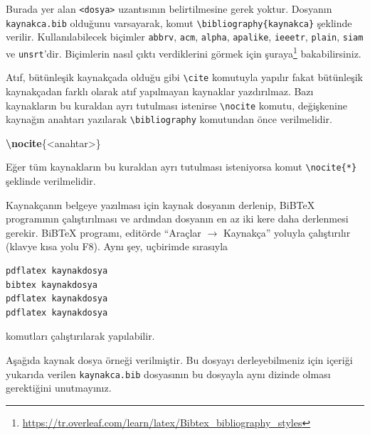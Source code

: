 \documentclass[
  10pt,
]{scrbook}
\newenvironment{Shaded}{\begin{snugshade}}{\end{snugshade}}
\newcommand{\ExtensionTok}[1]{#1}
\newcommand{\KeywordTok}[1]{\textcolor[rgb]{0.13,0.29,0.53}{\textbf{#1}}}
\newcommand{\NormalTok}[1]{#1}
\renewcommand{\href}[2]{#2\footnote{\url{#1}}}
\theoremstyle{definition}
\theoremstyle{definition}
\theoremstyle{definition}
\theoremstyle{definition}
\theoremstyle{remark}
\begin{document}
Burada yer alan \texttt{\textless{}dosya\textgreater{}} uzantısının belirtilmesine gerek yoktur. Dosyanın \texttt{kaynakca.bib} olduğunu varsayarak, komut \texttt{\textbackslash{}bibliography\{kaynakca\}} şeklinde verilir. Kullanılabilecek biçimler \texttt{abbrv}, \texttt{acm}, \texttt{alpha}, \texttt{apalike}, \texttt{ieeetr}, \texttt{plain}, \texttt{siam} ve \texttt{unsrt}'dir. Biçimlerin nasıl çıktı verdiklerini görmek için \href{https://tr.overleaf.com/learn/latex/Bibtex_bibliography_styles}{şuraya} bakabilirsiniz.

Atıf, bütünleşik kaynakçada olduğu gibi \texttt{\textbackslash{}cite} komutuyla yapılır fakat bütünleşik kaynakçadan farklı olarak atıf yapılmayan kaynaklar yazdırılmaz. Bazı kaynakların bu kuraldan ayrı tutulması istenirse \texttt{\textbackslash{}nocite} komutu, değişkenine kaynağın anahtarı yazılarak \texttt{\textbackslash{}bibliography} komutundan önce verilmelidir.

\begin{Shaded}
\begin{Highlighting}[]
\KeywordTok{\textbackslash{}nocite}\NormalTok{\{}\ExtensionTok{\textless{}anahtar\textgreater{}}\NormalTok{\}}
\end{Highlighting}
\end{Shaded}

Eğer tüm kaynakların bu kuraldan ayrı tutulması isteniyorsa komut \texttt{\textbackslash{}nocite\{*\}} şeklinde verilmelidir.

Kaynakçanın belgeye yazılması için kaynak dosyanın derlenip, BiBTeX programının çalıştırılması ve ardından dosyanın en az iki kere daha derlenmesi gerekir. BiBTeX programı, editörde ``Araçlar \(\rightarrow\) Kaynakça'' yoluyla çalıştırılır (klavye kısa yolu F8). Aynı şey, uçbirimde sırasıyla

\begin{verbatim}
pdflatex kaynakdosya
bibtex kaynakdosya
pdflatex kaynakdosya
pdflatex kaynakdosya
\end{verbatim}

komutları çalıştırılarak yapılabilir.

Aşağıda kaynak dosya örneği verilmiştir. Bu dosyayı derleyebilmeniz için içeriği yukarıda verilen \texttt{kaynakca.bib} dosyasının bu dosyayla aynı dizinde olması gerektiğini unutmayınız.
\end{document}
